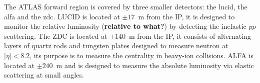 The ATLAS forward region is covered by three smaller detectors: the \gls{lucid},
the \gls{alfa} and the \gls{zdc}. LUCID is located at $\pm 17$~m from the IP, it
is designed to monitor the relative luminosity (\textbf{relative to what?}) by
detecting the inelastic $pp$ scattering. The ZDC is located at $\pm 140$~m from
the IP, it consists of alternating layers of quartz rods and tungsten plates
designed to measure neutron at $|\eta| < 8.2$, its purpose is to measure the
centrality in heavy-ion collisions. ALFA is located at $\pm 240$~m and is
designed to measure the absolute luminosity via elastic scattering at small
angles.
